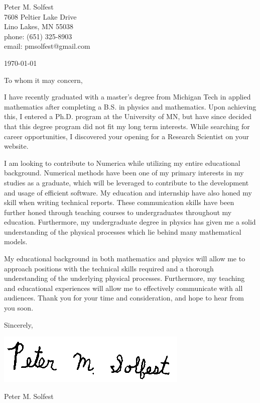 \documentclass[letterpaper,12pt]{article}
\begin{document}
Peter M. Solfest\\
7608 Peltier Lake Drive\\
Lino Lakes, MN 55038\\
phone: (651) 325-8903\\
email: pmsolfest@gmail.com

\today


To whom it may concern, %

I have recently graduated with a master's degree from Michigan Tech in applied mathematics after
completing a B.S. in physics and mathematics.
Upon achieving this, I entered a Ph.D. program at the University of MN, but have since
decided that this degree program did not fit my long term interests.
While searching for career opportunities, I discovered your opening for a Research Scientist
on your website.

I am looking to contribute to Numerica while utilizing my entire educational background.
Numerical methods have been one of my primary interests in my studies as a graduate,
which will be leveraged to contribute to the development and usage of efficient software.
My education and internship have also honed my skill when writing technical reports.
These communication skills have been further honed through teaching courses to undergraduates
throughout my education.
Furthermore, my undergraduate degree in physics has given me a solid understanding of the
physical processes which lie behind many mathematical models.

My educational background in both mathematics and physics will allow 
me to approach positions with the technical skills required and a thorough understanding
of the underlying physical processes.
Furthermore, my teaching and educational experiences will allow me to 
effectively communicate with all audiences.
Thank you for your time and consideration, and hope to hear from you soon.

Sincerely,

\includegraphics[height=.5in]{signature.png}

Peter M. Solfest
\end{document}
